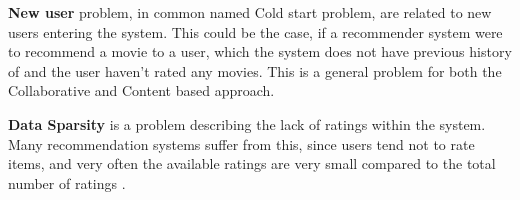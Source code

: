 \textbf{New user} problem, in common named Cold start problem, are related to new users entering the system. This could be the case, if a recommender system were to recommend a movie to a user, which the system does not have previous history of and the user haven't rated any movies. This is a general problem for both the Collaborative and Content based approach. \newline

\textbf{Data Sparsity} is a problem describing the lack of ratings within the system. Many recommendation systems suffer from this, since users tend not to rate items, and very often the available ratings are very small compared to the total number of ratings \citep[p. 19]{TowardsTheNextGenerationOfRs}. 

\newpage